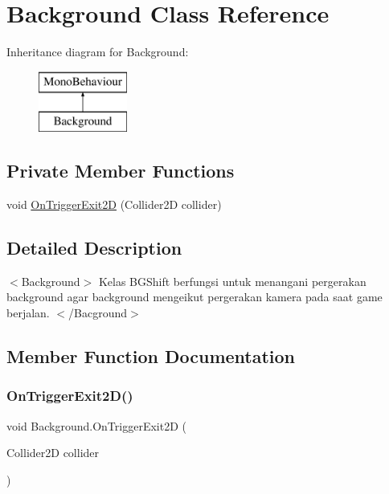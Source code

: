 \hypertarget{class_background}{}\section{Background Class Reference}
\label{class_background}
Inheritance diagram for Background\+:\begin{figure}[H]
\begin{center}
\leavevmode
\includegraphics[height=2.000000cm]{class_background}
\end{center}
\end{figure}
\subsection*{Private Member Functions}
\begin{DoxyCompactItemize}
\item 
void \hyperlink{class_background_ab1cd39876241a9c16a96be95d4da8ab8}{On\+Trigger\+Exit2D} (Collider2D collider)
\end{DoxyCompactItemize}


\subsection{Detailed Description}
$<$\+Background$>$ Kelas B\+G\+Shift berfungsi untuk menangani pergerakan background agar background mengeikut pergerakan kamera pada saat game berjalan. $<$/\+Bacground$>$ 

\subsection{Member Function Documentation}
\hypertarget{class_background_ab1cd39876241a9c16a96be95d4da8ab8}{}\label{class_background_ab1cd39876241a9c16a96be95d4da8ab8} 
\subsubsection{\texorpdfstring{On\+Trigger\+Exit2\+D()}{OnTriggerExit2D()}}
{\footnotesize\ttfamily void Background.\+On\+Trigger\+Exit2D (\begin{DoxyParamCaption}\item[{Collider2D}]{collider }\end{DoxyParamCaption})\hspace{0.3cm}{\ttfamily [private]}}


